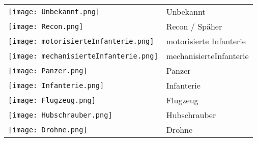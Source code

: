 \begin{longtable}{p{3cm} p{15cm}}
	\texttt{[image: Unbekannt.png]}		& 		Unbekannt \\
	\texttt{[image: Recon.png]}		 	& 		Recon / Späher \\
	\texttt{[image: motorisierteInfanterie.png]}		 & 		motorisierte Infanterie \\
	\texttt{[image: mechanisierteInfanterie.png]}		 & 		mechanisierteInfanterie\\
	\texttt{[image: Panzer.png]}		& 		Panzer \\
	\texttt{[image: Infanterie.png]}		& 		Infanterie \\
	\texttt{[image: Flugzeug.png]}		& 		Flugzeug \\
	\texttt{[image: Hubschrauber.png]}	&	 	Hubschrauber \\
	\texttt{[image: Drohne.png]}		& 		Drohne \\
\end{longtable}